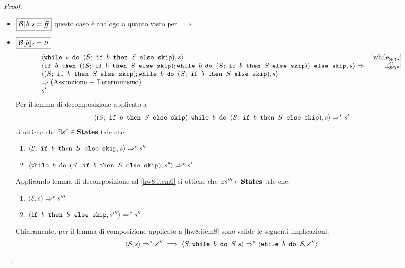 \begin{proof}
\begin{itemize}
  \item $\boxed{\B{b} = \semfalse}$ questo caso è analogo a quanto visto per
    $\boxed{\implies}$.
  \item $\boxed{\B{b} = \semtrue}$
  $$
  \begin{array}{lr}
  \confSs{\wbS{b}{(S;\ \ifABC{b}{S}{\skipForFriends})}}{s} & \whileSOS \\
  \confSs{\ifABC{b}
            {((S;\ \ifABC{b}{S}{\skipForFriends});
              \wbS{b}{(S;\ \ifABC{b}{S}{\skipForFriends})})}
            {\skipForFriends}
         }{s} \Rar{ }& \ifttSOS \\
  \confSs{  (S;\ \ifABC{b}{S}{\skipForFriends});
            \wbS{b}{(S;\ \ifABC{b}{S}{\skipForFriends})}
         }{s} \\
  \Rar{ } (\text{Assunzione + Determinismo})\\
  s'
  \end{array}
  $$
  Per il lemma di decomposizione applicato a
  \begin{equation}
  \confSs{  (S;\ \ifABC{b}{S}{\skipForFriends});
            \wbS{b}{(S;\ \ifABC{b}{S}{\skipForFriends})}
         }{s}
    \Rar{*} s'
  \label{eq:hw8:isimpl}
  \end{equation}
  si ottiene che $\exists s'' \in \states$ tale che:
  \begin{enumerate}[label=(\alph*)]
    \item $\confSs{S;\ \ifABC{b}{S}{\skipForFriends}}{s} \Rar{*} s''$
    \label{hw8:item6}
    \item $\confSs{\wbS{b}{(S;\ \ifABC{b}{S}{\skipForFriends})}}{s''}
      \Rar{*} s'$
    \label{hw8:item7}
  \end{enumerate}
  Applicando lemma di decomposizione ad \ref{hw8:item6}
  si ottiene che $\exists{s'''}\in\states$ tale che:
  \begin{enumerate}[label=(\alph*)]
    \item $\confSs{S}{s} \Rar{*} s'''$
    \label{hw8:item8}
    \item $\confSs{\ifABC{b}{S}{\skipForFriends}}{s'''} \Rar{*} s''$
    \label{hw8:item9}
  \end{enumerate}
  Chiaramente, per il lemma di composizione applicato a \ref{hw8:item8} sono
  valide le seguenti implicazioni:
  \begin{equation}
  \confSs{S}{s} \Rar{*} s'''
    \implies
  \confSs{S; \wbS{b}{S}}{s} \Rar{*} \confSs{\wbS{b}{S}}{s'''}
  \label{eq:hw8:item10}
  \end{equation}

\end{itemize}
\end{proof}

